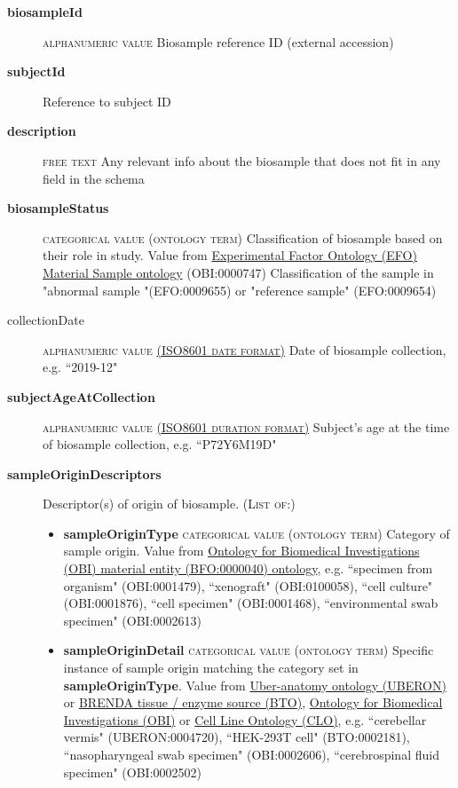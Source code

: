 \documentclass[a4paper, 10pt]{article}        %
\begin{document}
  \begin{description}
	\item[\textbf{biosampleId}]  {\textsc{alphanumeric value}} Biosample reference ID (external accession)
	\item[\textbf{subjectId}] Reference to subject ID
	\item[\textbf{description}]  {\textsc{free text}} Any relevant info about the biosample that does not fit in any field in the schema
	\item[\textbf{biosampleStatus}] {\textsc{categorical value (ontology term)}} Classification of biosample based on their role in study. Value from  \href{https://www.ebi.ac.uk/ols/ontologies/efo/terms?iri=http%3A%2F%2Fpurl.obolibrary.org%2Fobo%2FOBI_0000747&viewMode=All&siblings=false}{Experimental Factor Ontology (EFO) Material Sample ontology} (OBI:0000747) Classification of the sample in "abnormal sample "(EFO:0009655) or "reference sample" (EFO:0009654)
	\item[collectionDate] {\textsc{alphanumeric value \href{https://www.iso.org/iso-8601-date-and-time-format.html}{(ISO8601 date format)}}} Date of biosample collection, e.g. ``2019-12"
	\item[\textbf{subjectAgeAtCollection}] {\textsc{alphanumeric value \href{https://www.iso.org/iso-8601-date-and-time-format.html}{(ISO8601 duration format)}}} Subject's age at  the time of biosample collection, e.g. ``P72Y6M19D"
	\item[\textbf{sampleOriginDescriptors}] Descriptor(s) of origin of biosample. {\textsc{(List of:)}}
	\begin{itemize}
	\item[] \textbf{sampleOriginType} {\textsc{categorical value (ontology term)}} Category of sample origin. Value from \href{http://purl.obolibrary.org/obo/BFO_0000040}{Ontology for Biomedical Investigations (OBI) material entity (BFO:0000040) ontology}, e.g. ``specimen from organism" (OBI:0001479), ``xenograft" (OBI:0100058), ``cell culture" (OBI:0001876), ``cell specimen" (OBI:0001468), ``environmental swab specimen" (OBI:0002613)
	\item[] \textbf{sampleOriginDetail} {\textsc{categorical value (ontology term)}} Specific instance of sample origin matching the category set in \textbf{sampleOriginType}. Value from \href{https://www.ebi.ac.uk/ols/ontologies/uberon}{Uber-anatomy ontology (UBERON)} or \href{https://www.ebi.ac.uk/ols/ontologies/bto}{BRENDA tissue / enzyme source (BTO)}, \href{http://purl.obolibrary.org/obo/BFO_0000040}{Ontology for Biomedical Investigations (OBI)} or \href{www.ebi.ac.uk/ols/ontologies/clo}{Cell Line Ontology (CLO)}, e.g. ``cerebellar vermis" (UBERON:0004720), ``HEK-293T cell" (BTO:0002181), ``nasopharyngeal swab specimen" (OBI:0002606), ``cerebrospinal fluid specimen" (OBI:0002502)

\end{itemize}
\end{description}
\end{document}
